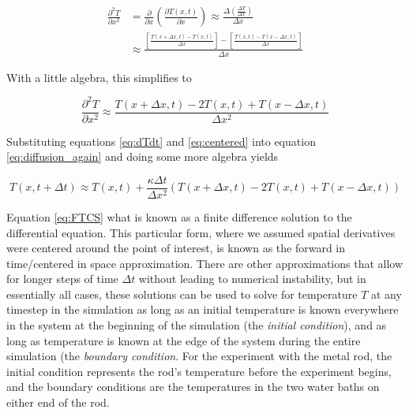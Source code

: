 \begin{equation} \label{eq:centered} 
\begin{split}
\frac{\partial^2 T}{\partial x^2}&= \frac{\partial }{\partial x}\left ( \frac{\partial T\left ( x,t \right )}{\partial x} \right )\approx \frac {\Delta\left ( \frac{\Delta T}{\Delta x} \right )}{\Delta x}
\\
&\approx \frac{\left [ \frac{T\left ( x+\Delta x,t \right )-T\left ( x,t \right )}{\Delta x} \right ]-\left [ \frac{T\left ( x,t \right )-T\left ( x-\Delta x,t \right )}{\Delta x} \right ]}{\Delta x}
\end{split}
\end{equation}

With a little algebra, this simplifies to 

\begin{equation} \label{eq:centered} 
\frac{\partial^2 T}{\partial x^2}\approx \frac{T\left ( x+\Delta x,t \right )-2T\left ( x,t \right )+T\left ( x-\Delta x,t \right )}{\Delta x^{2}}
\end{equation}

Substituting equations \ref{eq:dTdt} and \ref{eq:centered} into equation \ref{eq:diffusion_again} and doing some more algebra yields

\begin{equation} \label{eq:FTCS} 
T\!\left ( x,t\!+\!\Delta t \right ) \approx T\!\left ( x,t \right )+\frac{\kappa \Delta t}{\Delta x^{2}}\left ( T\!\left ( x\!+\!\Delta x\!,\!t \right ) -2T\!\left ( x,t \right )+T\!\left ( x\!-\!\Delta x,t \right )\right )
\end{equation}

Equation \ref{eq:FTCS} what is known as a finite difference solution to the differential equation.
This particular form, where we assumed spatial derivatives were centered around the point of interest, is known as the forward in time/centered in space approximation.
There are other approximations that allow for longer steps of time $\Delta t$ without leading to numerical instability, but in essentially all cases, these solutions can be used to solve for temperature $T$ at any timestep in the simulation as long as an initial temperature is known everywhere in the system at the beginning of the simulation (the \emph{initial condition}), and as long as temperature is known at the edge of the system during the entire simulation (the \emph{boundary condition}.
For the experiment with the metal rod, the initial condition represents the rod's temperature before the experiment begins, and the boundary conditions are the temperatures in the two water baths on either end of the rod.  

